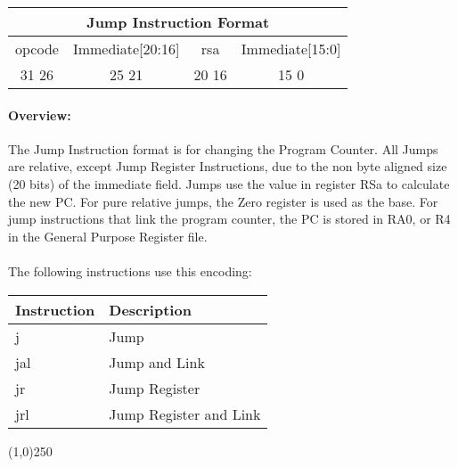 \documentclass[letterpaper, 11pt]{article}
\begin{document}
\begin{center}
		\begin{tabular}{|c|c|c|c|}
				\multicolumn{4}{c}{Jump Instruction Format}\\ \hline
				\hspace{2pt} opcode \hspace{2pt}  & \hspace{3pt} Immediate[20:16] \hspace{3pt} &  \hspace{4pt} rsa \hspace{4pt} & \hspace{10pt} Immediate[15:0]  \hspace{10pt}   \\	\hline
							31 \hfill 26& 25  \hfill 21 &20 \hfill  16& 15 \hfill   0\\ \hline
		
	\end{tabular}
\end{center}	
\paragraph{Overview:} The Jump Instruction format is for changing the Program Counter. 
All Jumps are relative, except Jump Register Instructions,
due to the non byte aligned size (20 bits) of the immediate field. Jumps use the value in register RSa to calculate
the new PC. For pure relative jumps, the Zero register is used as the base. For jump instructions that link the program counter, 
the PC is stored in RA0, or R4 in the General Purpose Register file.
\paragraph{}The following instructions use this encoding: \\
\begin{center}
	\begin{tabular}{|l|l|} \hline
			Instruction & Description 				\\ \hline
			j			& Jump						\\ \hline
			jal			& Jump and Link				\\ \hline
			jr			& Jump Register				\\ \hline
			jrl			& Jump Register and Link	\\ \hline


\end{tabular}
\end{center}
\begin{center}
	\line(1,0){250}
\end{center}
\end{document}
